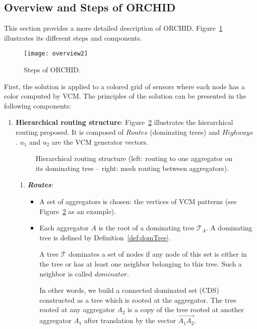\subsection{Overview and Steps of ORCHID}
This section provides a more detailed description of ORCHID. Figure~\ref{fig:steps} illustrates its different steps and components.

\begin{figure}[H]
\centering
\texttt{[image: overview2]}\caption{Steps of ORCHID.\label{fig:steps}}
\end{figure}
First, the solution is applied to a colored grid of sensors where each node has a color computed by VCM. The principles of the solution can be presented in the following components:

\begin{enumerate}
\item \textbf{Hierarchical routing structure}:
Figure~\ref{fig:overview} illustrates the hierarchical routing proposed. It is composed of $Routes$ (dominating trees) and $Highways$. $u_1$ and $u_2$ are the VCM generator vectors.
\begin{figure}[H]
\centering
{}
\caption{Hierarchical routing structure (left: routing to one aggregator on its dominating tree -- right: mesh routing between aggregators).\label{fig:overview}}
\end{figure}
\begin{enumerate}
\item \textbf{\textit{Routes}}:
\begin{itemize}


\item A set of aggregators is chosen: the vertices of VCM patterns (see Figure~\ref{fig:overview} as an example).
\item Each aggregator $A$ is the root of a dominating tree $\mathcal{T}_{A}$. A dominating tree is defined by Definition~\ref{def:domTree}.
\begin{definition} \label{def:domTree}
A tree $\mathcal{T}$ dominates a set of nodes if any node of this set is either in the tree or has at least one neighbor belonging to this tree. Such a neighbor is called $dominator$.
\end{definition}

In other words, we build a connected dominated set (CDS) constructed as a tree which is rooted at the aggregator. The tree rooted at any aggregator $A_2$ is a copy of the tree rooted at another aggregator $A_1$ after translation by the vector $\vec{A_1A_2}$. 


\end{itemize}
\end{enumerate}
\end{enumerate}
